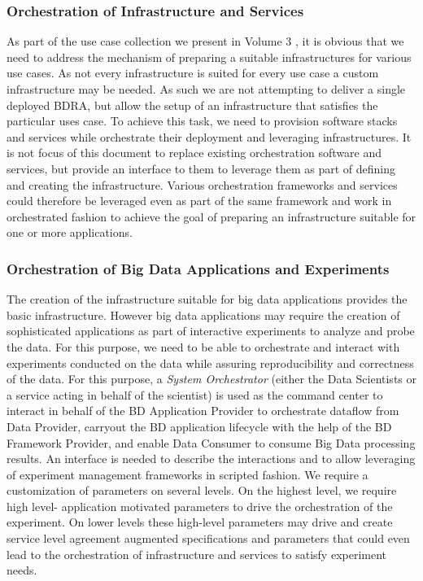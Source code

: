 \documentclass[10pt]{article}
\begin{document}
\subsubsection{Orchestration of Infrastructure and Services}

As part of the use case collection we present in Volume 3
\cite{nist-vol-3}, it is obvious that we need to address the mechanism
of preparing a suitable infrastructures for various use cases. As not
every infrastructure is suited for every use case a custom
infrastructure may be needed. As such we are not attempting to deliver
a single deployed BDRA, but allow the setup of an infrastructure that
satisfies the particular uses case. To achieve this task, we need to
provision software stacks and services while orchestrate their
deployment and leveraging infrastructures. It is not focus of this
document to replace existing orchestration software and services, but
provide an interface to them to leverage them as part of defining and
creating the infrastructure. Various orchestration frameworks and
services could therefore be leveraged even as part of the same
framework and work in orchestrated fashion to achieve the goal of
preparing an infrastructure suitable for one or more applications.

\subsubsection{Orchestration of Big Data Applications and Experiments}

The creation of the infrastructure suitable for big data applications
provides the basic infrastructure. However big data applications may
require the creation of sophisticated applications as part of
interactive experiments to analyze and probe the data. For this
purpose, we need to be able to orchestrate and interact with
experiments conducted on the data while assuring reproducibility and
correctness of the data. For this purpose, a {\it System Orchestrator}
(either the Data Scientists or a service acting in behalf of the
scientist) is used as the command center to interact in behalf of the
BD Application Provider to orchestrate dataflow from Data Provider,
carryout the BD application lifecycle with the help of the BD
Framework Provider, and enable Data Consumer to consume Big Data
processing results. An interface is needed to describe the
interactions and to allow leveraging of experiment management
frameworks in scripted fashion. We require a customization of
parameters on several levels. On the highest level, we require high
level- application motivated parameters to drive the orchestration of
the experiment. On lower levels these high-level parameters may drive
and create service level agreement augmented specifications and
parameters that could even lead to the orchestration of infrastructure
and services to satisfy experiment needs.
\end{document}
